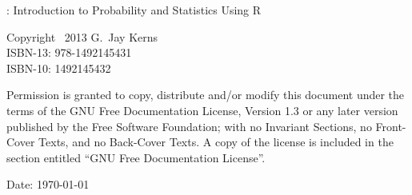 %
%

\setcounter{page}{2}

\noindent \IPSUR: Introduction to Probability and Statistics Using \textsf{R}

\noindent Copyright \textcopyright~2013 G.~Jay Kerns \\ 
\noindent ISBN-13: 978-1492145431 \\ 
\noindent ISBN-10: 1492145432 \\ 
\medskip{}

\noindent Permission is granted to copy, distribute and/or modify this
document under the terms of the GNU Free Documentation License,
Version 1.3 or any later version published by the Free Software
Foundation; with no Invariant Sections, no Front-Cover Texts, and no
Back-Cover Texts. A copy of the license is included in the section
entitled ``GNU Free Documentation License''.

\vspace{0.25in}
\noindent Date: \today
\noindent \vfill{}

\cleardoublepage
{}
{}

\tableofcontents{}
